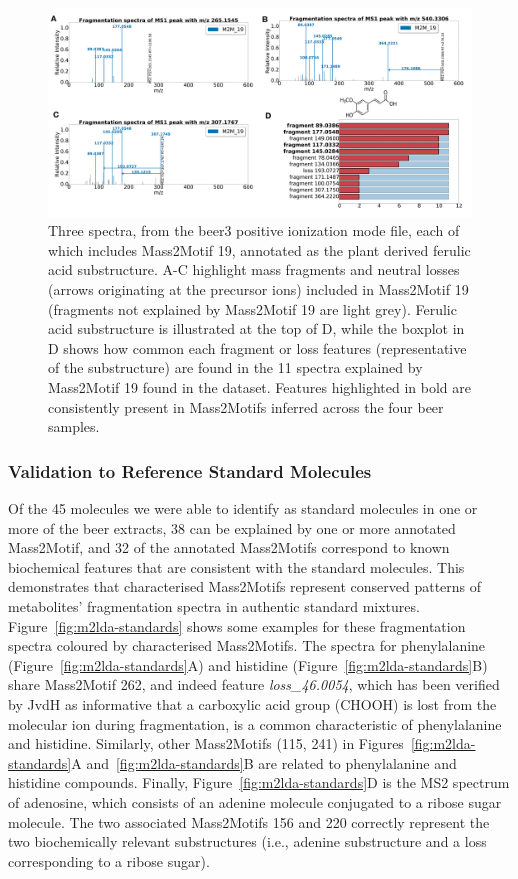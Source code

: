\begin{figure}[!htbp]
\centering\includegraphics[width=0.8\linewidth]{07-lda/figures/figure3.pdf}
\centering\caption{Three spectra, from the beer3 positive ionization mode file, each of which includes Mass2Motif 19, annotated as the plant derived ferulic acid substructure. A-C highlight mass fragments and neutral losses (arrows originating at the precursor ions) included in Mass2Motif 19 (fragments not explained by Mass2Motif 19 are light grey). Ferulic acid substructure is illustrated at the top of D, while the boxplot in D shows how common each fragment or loss features (representative of the substructure) are found in the 11 spectra explained by Mass2Motif 19 found in the dataset. Features highlighted in bold are consistently present in Mass2Motifs inferred across the four beer samples.\label{fig:m2lda-ferulic-acid}}
\end{figure}

\subsubsection{Validation to Reference Standard Molecules}

Of the 45 molecules we were able to identify as standard molecules in one or more of the beer extracts, 38 can be explained by one or more annotated Mass2Motif, and 32 of the annotated Mass2Motifs correspond to known biochemical features that are consistent with the standard molecules. This demonstrates that characterised Mass2Motifs represent conserved patterns of metabolites' fragmentation spectra in authentic standard mixtures. Figure~\ref{fig:m2lda-standards} shows some examples for these fragmentation spectra coloured by characterised Mass2Motifs. The spectra for phenylalanine (Figure~\ref{fig:m2lda-standards}A) and histidine (Figure~\ref{fig:m2lda-standards}B) share Mass2Motif 262, and indeed feature \textit{loss\_46.0054}, which has been verified by JvdH as informative that a carboxylic acid group (CHOOH) is lost from the molecular ion during fragmentation, is a common characteristic of phenylalanine and histidine. Similarly, other Mass2Motifs (115, 241) in Figures~\ref{fig:m2lda-standards}A and~\ref{fig:m2lda-standards}B are related to phenylalanine and histidine compounds. Finally, Figure~\ref{fig:m2lda-standards}D is the MS2 spectrum of adenosine, which consists of an adenine molecule conjugated to a ribose sugar molecule. The two associated Mass2Motifs 156 and 220 correctly represent the two biochemically relevant substructures (i.e., adenine substructure and a loss corresponding to a ribose sugar). 

